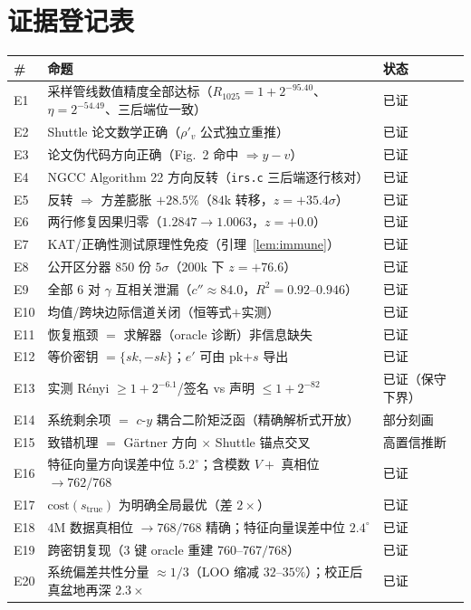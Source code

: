 \documentclass[11pt,a4paper]{ctexart}
\begin{document}
\clearpage
\section{证据登记表}

\begin{longtable}{p{0.6cm}p{7.6cm}p{5.6cm}}
\toprule
\# & 命题 & 状态\\
\midrule
E1 & 采样管线数值精度全部达标（$R_{1025}{=}1{+}2^{-95.40}$、$\eta{=}2^{-54.49}$、三后端位一致） & 已证\\
E2 & Shuttle 论文数学正确（$\rho'_v$ 公式独立重推） & 已证\\
E3 & 论文伪代码方向正确（Fig.~2 命中 $\Rightarrow y-v$） & 已证\\
E4 & NGCC Algorithm 22 方向反转（\texttt{irs.c} 三后端逐行核对） & 已证\\
E5 & 反转 $\Rightarrow$ 方差膨胀 $+28.5\%$（$84$k 转移，$z{=}+35.4\sigma$） & 已证\\
E6 & 两行修复因果归零（$1.2847\to1.0063$，$z{=}+0.0$） & 已证\\
E7 & KAT/正确性测试原理性免疫（引理~\ref{lem:immune}） & 已证\\
E8 & 公开区分器 $850$ 份 $5\sigma$（$200$k 下 $z{=}+76.6$） & 已证\\
E9 & 全部 $6$ 对 $\gamma$ 互相关泄漏（$c''{\approx}84.0$，$R^2{=}0.92$--$0.946$） & 已证\\
E10 & 均值/跨块边际信道关闭（恒等式$+$实测） & 已证\\
E11 & 恢复瓶颈 $=$ 求解器（oracle 诊断）非信息缺失 & 已证\\
E12 & 等价密钥 $=\{sk,-sk\}$；$e'$ 可由 pk$+s$ 导出 & 已证\\
E13 & 实测 Rényi $\ge1{+}2^{-6.1}$/签名 vs 声明 $\le1{+}2^{-82}$ & 已证（保守下界）\\
E14 & 系统剩余项 $=$ $c$-$y$ 耦合二阶矩泛函（精确解析式开放） & 部分刻画\\
E15 & 致错机理 $=$ G\"artner 方向 $\times$ Shuttle 锚点交叉 & 高置信推断\\
E16 & 特征向量方向误差中位 $5.2^\circ$；含模数 $V+$ 真相位 $\to762/768$ & 已证\\
E17 & $\mathrm{cost}(s_{\text{true}})$ 为明确全局最优（差 $2\times$） & 已证\\
E18 & $4$M 数据真相位 $\to768/768$ 精确；特征向量误差中位 $2.4^\circ$ & 已证\\
E19 & 跨密钥复现（$3$ 键 oracle 重建 $760$--$767/768$） & 已证\\
E20 & 系统偏差共性分量 $\approx1/3$（LOO 缩减 $32$--$35\%$）；校正后真盆地再深 $2.3\times$ & 已证\\

\end{longtable}
\end{document}

